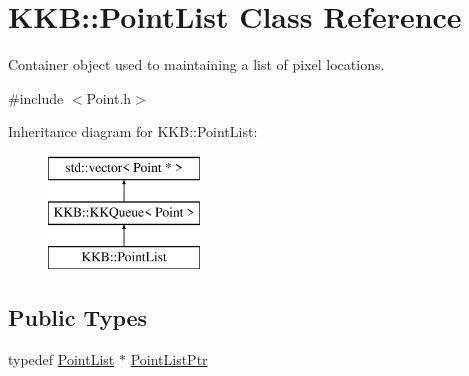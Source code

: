 \hypertarget{class_k_k_b_1_1_point_list}{}\section{K\+KB\+:\+:Point\+List Class Reference}
\label{class_k_k_b_1_1_point_list}


Container object used to maintaining a list of pixel locations.  




{\ttfamily \#include $<$Point.\+h$>$}

Inheritance diagram for K\+KB\+:\+:Point\+List\+:\begin{figure}[H]
\begin{center}
\leavevmode
\includegraphics[height=3.000000cm]{class_k_k_b_1_1_point_list}
\end{center}
\end{figure}
\subsection*{Public Types}
\begin{DoxyCompactItemize}
\item 
typedef \hyperlink{class_k_k_b_1_1_point_list}{Point\+List} $\ast$ \hyperlink{class_k_k_b_1_1_point_list_af5058320a40be067bf73c2d78ff8b35d}{Point\+List\+Ptr}
\end{DoxyCompactItemize}
